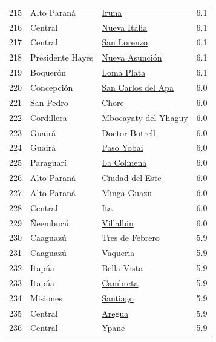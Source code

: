 {\begin{longtable}[]{@{}llll@{}}
215 & Alto Paraná & \hyperref[dist:10_Alto_Parana:Iruna]{Iruna} & 6.1 \\
216 & Central & \hyperref[dist:11_Central:Nueva_Italia]{Nueva Italia} & 6.1 \\
217 & Central & \hyperref[dist:11_Central:San_Lorenzo]{San Lorenzo} & 6.1 \\
218 & Presidente Hayes & \hyperref[dist:15_Presidente_Hayes:Nueva_Asunción]{Nueva Asunción} & 6.1 \\
219 & Boquerón & \hyperref[dist:16_Boqueron:Loma_Plata]{Loma Plata} & 6.1 \\
220 & Concepción & \hyperref[dist:01_Concepción:San_Carlos_del_Apa]{San Carlos del Apa} & 6.0 \\
221 & San Pedro & \hyperref[dist:02_San_Pedro:Chore]{Chore} & 6.0 \\
222 & Cordillera & \hyperref[dist:03_Cordillera:Mbocayaty_del_Yhaguy]{Mbocayaty del Yhaguy} & 6.0 \\
223 & Guairá & \hyperref[dist:04_Guaira:Doctor_Botrell]{Doctor Botrell} & 6.0 \\
224 & Guairá & \hyperref[dist:04_Guaira:Paso_Yobai]{Paso Yobai} & 6.0 \\
225 & Paraguarí & \hyperref[dist:09_Paraguari:La_Colmena]{La Colmena} & 6.0 \\
226 & Alto Paraná & \hyperref[dist:10_Alto_Parana:Ciudad_del_Este]{Ciudad del Este} & 6.0 \\
227 & Alto Paraná & \hyperref[dist:10_Alto_Parana:Minga_Guazu]{Minga Guazu} & 6.0 \\
228 & Central & \hyperref[dist:11_Central:Ita]{Ita} & 6.0 \\
229 & Ñeembucú & \hyperref[dist:12_Neembucu:Villalbin]{Villalbin} & 6.0 \\
230 & Caaguazú & \hyperref[dist:05_Caaguazu:Tres_de_Febrero]{Tres de Febrero} & 5.9 \\
231 & Caaguazú & \hyperref[dist:05_Caaguazu:Vaqueria]{Vaqueria} & 5.9 \\
232 & Itapúa & \hyperref[dist:07_Itapua:Bella_Vista]{Bella Vista} & 5.9 \\
233 & Itapúa & \hyperref[dist:07_Itapua:Cambreta]{Cambreta} & 5.9 \\
234 & Misiones & \hyperref[dist:08_Misiones:Santiago]{Santiago} & 5.9 \\
235 & Central & \hyperref[dist:11_Central:Aregua]{Aregua} & 5.9 \\
236 & Central & \hyperref[dist:11_Central:Ypane]{Ypane} & 5.9 \\

\end{longtable}}
